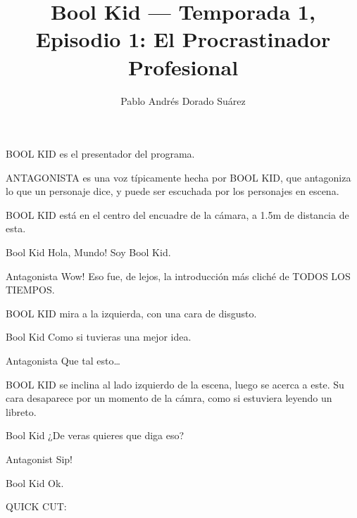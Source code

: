 \documentclass{screenplay}[2018/01/07]
\title{Bool Kid — Temporada 1, Episodio 1: El Procrastinador Profesional}
\author{Pablo Andrés Dorado Suárez}
\begin{document}
    \coverpage

    \fadein
    BOOL KID es el presentador del programa.

    ANTAGONISTA es una voz típicamente hecha por BOOL KID, que antagoniza lo que
    un personaje dice, y puede ser escuchada por los personajes en escena.

    \vspace{1em}
    \vspace{2em}


    BOOL KID está en el centro del encuadre de la cámara, a 1.5m de distancia de
    esta.

    \begin{dialogue}{Bool Kid}
        Hola, Mundo! Soy Bool Kid.
    \end{dialogue}

    \begin{dialogue}{Antagonista}
        Wow! Eso fue, de lejos, la introducción más cliché de TODOS LOS TIEMPOS.
    \end{dialogue}

    BOOL KID mira a la izquierda, con una cara de disgusto.

    \begin{dialogue}{Bool Kid}
        Como si tuvieras una mejor idea.
    \end{dialogue}

    \begin{dialogue}{Antagonista}
        Que tal esto\dots
    \end{dialogue}

    BOOL KID se inclina al lado izquierdo de la escena, luego se acerca a este.
    Su cara desaparece por un momento de la cámra, como si estuviera leyendo un
    libreto.

    \begin{dialogue}{Bool Kid}
        ¿De veras quieres que diga eso?
    \end{dialogue}

    \begin{dialogue}{Antagonist}
        Sip!
    \end{dialogue}

    \begin{dialogue}[sighing]{Bool Kid}
        Ok.
    \end{dialogue}

    \begin{flushright}
        QUICK CUT:
    \end{flushright}
\end{document}
